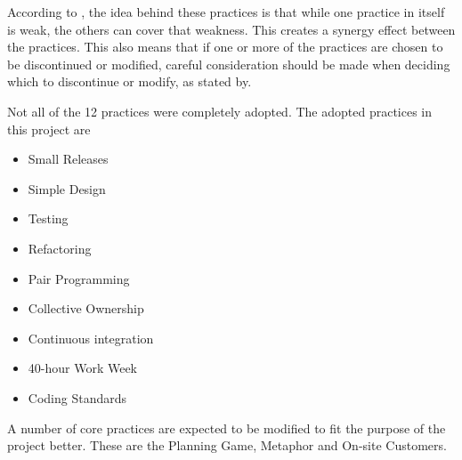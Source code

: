 According to \citep[p. 53]{xp:explained}, the idea behind these practices is that while one practice in itself is weak, the others can cover that weakness. This creates a synergy effect between the practices. This also means that if one or more of the practices are chosen to be discontinued or modified, careful consideration should be made when deciding which to discontinue or modify, as stated by.

Not all of the 12 practices were completely adopted. The adopted practices in this project are\\

\begin{itemize}
\item Small Releases
\item Simple Design
\item Testing
\item Refactoring
\item Pair Programming
\item Collective Ownership
\item Continuous integration
\item 40-hour Work Week
\item Coding Standards
\end{itemize}

A number of core practices are expected to be modified to fit the purpose of the project better. These are the Planning Game, Metaphor and On-site Customers.\\\\

